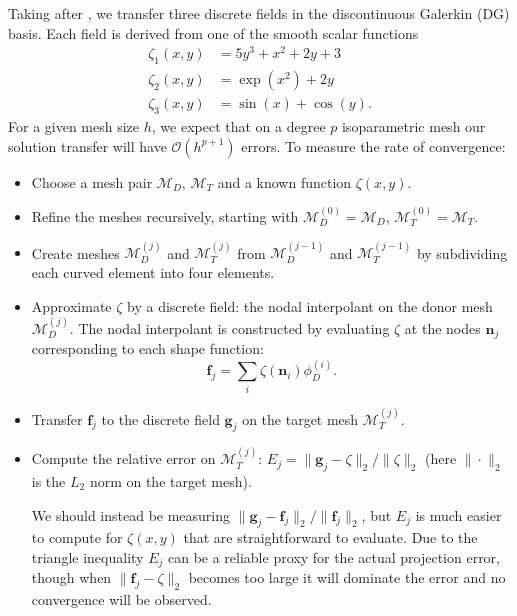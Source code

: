 \documentclass[oneside, reqno]{amsart}
\theoremstyle{definition}
\newcommand{\bigO}[1]{\mathcal{O}\left(#1\right)}
\begin{document}
Taking after \cite{Farrell2011}, we transfer three
discrete fields in the discontinuous Galerkin (DG) basis.
Each field is derived from one of the smooth scalar functions
\begin{align}
\zeta_1(x, y) &= 5 y^3 + x^2 + 2y + 3 \\
\zeta_2(x, y) &= \exp\left(x^2\right) + 2y \\
\zeta_3(x, y) &= \sin(x) + \cos(y).
\end{align}
For a given mesh size \(h\), we expect that on a degree \(p\) isoparametric
mesh our solution transfer will have \(\bigO{h^{p + 1}}\) errors. To measure
the rate of convergence:
\begin{itemize}
\itemsep 0em
\item Choose a mesh pair \(\mathcal{M}_D\), \(\mathcal{M}_T\) and
a known function \(\zeta(x, y)\).
\item Refine the meshes recursively, starting with
  \(\mathcal{M}_D^{(0)} = \mathcal{M}_D\),
  \(\mathcal{M}_T^{(0)} = \mathcal{M}_T\).
\item Create meshes
\(\mathcal{M}_D^{(j)}\) and \(\mathcal{M}_T^{(j)}\) from
\(\mathcal{M}_D^{(j - 1)}\)
and \(\mathcal{M}_T^{(j - 1)}\) by subdividing each curved
element into four elements.
\item Approximate \(\zeta\) by a discrete field: the nodal
interpolant on the donor mesh \(\mathcal{M}_D^{(j)}\). The
nodal interpolant is constructed by evaluating \(\zeta\) at the
nodes \(\bm{n}_j\) corresponding to each shape function:
\begin{equation}
\bm{f}_j = \sum_i \zeta\left(\bm{n}_i\right) \phi_D^{(i)}.
\end{equation}
\item Transfer \(\bm{f}_j\) to the discrete field \(\bm{g}_j\) on
the target mesh  \(\mathcal{M}_T^{(j)}\).
\item Compute the relative error on \(\mathcal{M}_T^{(j)}\):
\(E_j = \| \bm{g}_j - \zeta \|_2 / \| \zeta \|_2\) (here \(\| \cdot \|_2\)
is the \(L_2\) norm on the target mesh).

We should instead be measuring \(\| \bm{g}_j - \bm{f}_j \|_2 /
\| \bm{f}_j \|_2\), but \(E_j\) is much easier to
compute for \(\zeta(x, y)\) that are straightforward to evaluate.
Due to the triangle inequality \(E_j\) can be a reliable proxy
for the actual projection error, though when
\(\| \bm{f}_j - \zeta \|_2\) becomes too large it will dominate
the error and no convergence will be observed.
\end{itemize}
\end{document}
